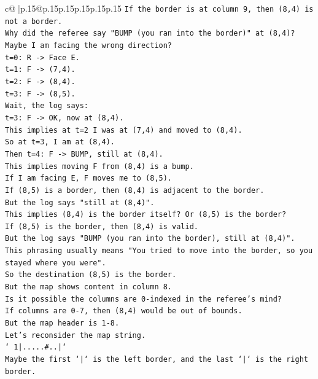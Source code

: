 \documentclass{article}
\begin{document}
{\begin{supertabular}{c@{$\;$}|p{.15\linewidth}@{}p{.15\linewidth}p{.15\linewidth}p{.15\linewidth}p{.15\linewidth}p{.15\linewidth}}
{{{\texttt{If the border is at column 9, then (8,4) is not a border.} \\
\texttt{Why did the referee say "BUMP (you ran into the border)" at (8,4)?} \\
\texttt{Maybe I am facing the wrong direction?} \\
\texttt{t=0: R {-}> Face E.} \\
\texttt{t=1: F {-}> (7,4).} \\
\texttt{t=2: F {-}> (8,4).} \\
\texttt{t=3: F {-}> (8,5).} \\
\texttt{Wait, the log says:} \\
\texttt{t=3: F {-}> OK, now at (8,4).} \\
\texttt{This implies at t=2 I was at (7,4) and moved to (8,4).} \\
\texttt{So at t=3, I am at (8,4).} \\
\texttt{Then t=4: F {-}> BUMP, still at (8,4).} \\
\texttt{This implies moving F from (8,4) is a bump.} \\
\texttt{If I am facing E, F moves me to (8,5).} \\
\texttt{If (8,5) is a border, then (8,4) is adjacent to the border.} \\
\texttt{But the log says "still at (8,4)".} \\
\texttt{This implies (8,4) is the border itself? Or (8,5) is the border?} \\
\texttt{If (8,5) is the border, then (8,4) is valid.} \\
\texttt{But the log says "BUMP (you ran into the border), still at (8,4)".} \\
\texttt{This phrasing usually means "You tried to move into the border, so you stayed where you were".} \\
\texttt{So the destination (8,5) is the border.} \\
\texttt{But the map shows content in column 8.} \\
\texttt{Is it possible the columns are 0{-}indexed in the referee's mind?} \\
\texttt{If columns are 0{-}7, then (8,4) would be out of bounds.} \\
\texttt{But the map header is 1{-}8.} \\
\texttt{Let's reconsider the map string.} \\
\texttt{` 1|.....\#..|`} \\
\texttt{Maybe the first `|` is the left border, and the last `|` is the right border.} \\
}}}
\end{supertabular}}
\end{document}

